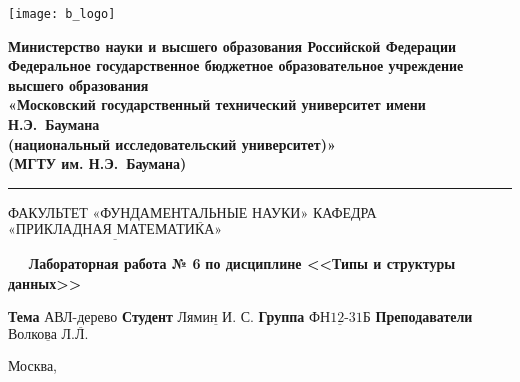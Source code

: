 \thispagestyle{empty}

\noindent \begin{minipage}{0.15\textwidth}
	\texttt{[image: b\_logo]}
\end{minipage}
\noindent\begin{minipage}{0.85\textwidth}\centering
	\textbf{Министерство науки и высшего образования Российской Федерации}\\
	\textbf{Федеральное государственное бюджетное образовательное учреждение высшего образования}\\
	\textbf{«Московский государственный технический университет имени Н.Э.~Баумана}\\
	\textbf{(национальный исследовательский университет)»}\\
	\textbf{(МГТУ им. Н.Э.~Баумана)}
\end{minipage}

\noindent\rule{\linewidth}{3pt}
\newline\newline
\noindent ФАКУЛЬТЕТ $\underline{\text{«ФУНДАМЕНТАЛЬНЫЕ НАУКИ»}}$ \newline\newline
\noindent КАФЕДРА $\underline{\text{«ПРИКЛАДНАЯ МАТЕМАТИКА»}}$

\vspace{1cm}

\begin{center}
	\centering
	\Large\textbf{$\ \ \ \ \ $  Лабораторная работа № 6}\newline
	\textbf{по дисциплине <<Типы и структуры данных>>}\newline\newline
	
\end{center}

\noindent\textbf{Тема} $\underline{\text{АВЛ-дерево}}$\newline\newline
\noindent\textbf{Студент} $\underline{\text{Лямин И. С.}}$\newline\newline
\noindent\textbf{Группа} $\underline{\text{ФН12-31Б}}$\newline\newline
\noindent\textbf{Преподаватели} $\underline{\text{Волкова Л.Л.}}$\newline

\begin{center}
	\vfill
	Москва,~\the\year
\end{center}
\clearpage
